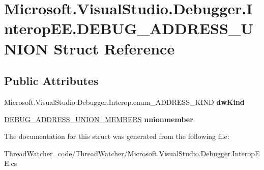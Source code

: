 \hypertarget{struct_microsoft_1_1_visual_studio_1_1_debugger_1_1_interop_e_e_1_1_d_e_b_u_g___a_d_d_r_e_s_s___u_n_i_o_n}{\section{Microsoft.\+Visual\+Studio.\+Debugger.\+Interop\+E\+E.\+D\+E\+B\+U\+G\+\_\+\+A\+D\+D\+R\+E\+S\+S\+\_\+\+U\+N\+I\+O\+N Struct Reference}
\label{struct_microsoft_1_1_visual_studio_1_1_debugger_1_1_interop_e_e_1_1_d_e_b_u_g___a_d_d_r_e_s_s___u_n_i_o_n}
}
\subsection*{Public Attributes}
\begin{DoxyCompactItemize}
\item 
\hypertarget{struct_microsoft_1_1_visual_studio_1_1_debugger_1_1_interop_e_e_1_1_d_e_b_u_g___a_d_d_r_e_s_s___u_n_i_o_n_a15db2bff7639cb4ae1d46e68a7918882}{Microsoft.\+Visual\+Studio.\+Debugger.\+Interop.\+enum\+\_\+\+A\+D\+D\+R\+E\+S\+S\+\_\+\+K\+I\+N\+D {\bfseries dw\+Kind}}\label{struct_microsoft_1_1_visual_studio_1_1_debugger_1_1_interop_e_e_1_1_d_e_b_u_g___a_d_d_r_e_s_s___u_n_i_o_n_a15db2bff7639cb4ae1d46e68a7918882}

\item 
\hypertarget{struct_microsoft_1_1_visual_studio_1_1_debugger_1_1_interop_e_e_1_1_d_e_b_u_g___a_d_d_r_e_s_s___u_n_i_o_n_a76f4220e55127ad9bc066d0248f3b024}{\hyperlink{struct_microsoft_1_1_visual_studio_1_1_debugger_1_1_interop_e_e_1_1_d_e_b_u_g___a_d_d_r_e_s_s___u_n_i_o_n___m_e_m_b_e_r_s}{D\+E\+B\+U\+G\+\_\+\+A\+D\+D\+R\+E\+S\+S\+\_\+\+U\+N\+I\+O\+N\+\_\+\+M\+E\+M\+B\+E\+R\+S} {\bfseries unionmember}}\label{struct_microsoft_1_1_visual_studio_1_1_debugger_1_1_interop_e_e_1_1_d_e_b_u_g___a_d_d_r_e_s_s___u_n_i_o_n_a76f4220e55127ad9bc066d0248f3b024}

\end{DoxyCompactItemize}


The documentation for this struct was generated from the following file\+:\begin{DoxyCompactItemize}
\item 
Thread\+Watcher\+\_\+code/\+Thread\+Watcher/Microsoft.\+Visual\+Studio.\+Debugger.\+Interop\+E\+E.\+cs\end{DoxyCompactItemize}
